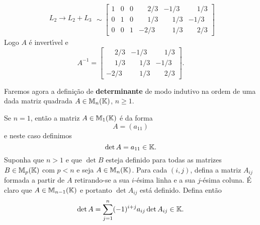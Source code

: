 \begin{exemplo}
\begin{solucao}
\begin{align*}
\begin{array}{l}
		    		L_2 \to L_2 + L_3\\
				\end{array} \sim
				\left[
					\begin{array}{ccc|ccc}
						1 & 0 & 0 & \phantom{-}2/3 & -1/3 & \phantom{-}1/3 \\
						0 & 1 & 0 & \phantom{-}1/3 & \phantom{-}1/3 & -1/3\\
						0 & 0 & 1 & -2/3 & \phantom{-}1/3 & \phantom{-}2/3
					\end{array}
				\right]
		\end{align*}
		Logo $A$ \'e invert{\'\i}vel e
		\[
			A^{-1} =
			\begin{bmatrix}
				\phantom{-}2/3 & -1/3 & \phantom{-}1/3 \\
				\phantom{-}1/3 & \phantom{-}1/3 & -1/3\\
				-2/3 & \phantom{-}1/3 & \phantom{-}2/3
			\end{bmatrix}.
		\]
	\end{solucao}
\end{exemplo}

Faremos agora a defini\c{c}\~ao de \textbf{determinante} de modo indutivo na ordem de uma dada matriz quadrada $A \in \mathbb{M}_n(\mathbb{K})$, $n \ge 1$.

Se $n = 1$, ent\~ao a matriz $A \in \mathbb{M}_1(\mathbb{K})$ \'e da forma
\[
	A = (a_{11})
\]
e neste caso definimos
\[
	\det A = a_{11} \in \mathbb{K}.
\]
Suponha que $n > 1$ e que $\det B$ esteja definido para todas as matrizes  $B \in \mathbb{M}_p(\mathbb{K})$ com $p < n$ e seja 
$A \in \mathbb{M}_n(\mathbb{K})$. Para cada $(i,j)$, defina a matriz $A_{ij}$ formada a partir de $A$ retirando-se a sua $i$-\'esima linha e a sua $j$-\'esima coluna. \'E claro que $A \in \mathbb{M}_{n - 1}(\mathbb{K})$ e portanto $\det A_{ij}$ est\'a definido. Defina ent\~ao
\[
	\det A = \sum_{j = 1}^n(-1)^{i + j}a_{ij}\det A_{ij} \in \mathbb{K}.
\]

